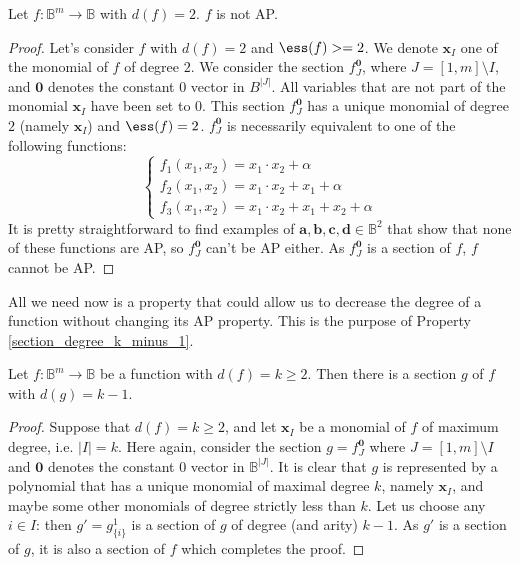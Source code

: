 \documentclass[article]{amsart}
\begin{document}
\begin{proper} \label{degree_2_not_AP}
 Let $f\colon \mathbb{B}^m\to \mathbb{B}$ with $d(f)=2$. $f$ is not AP.
\end{proper}
\begin{proof}
  Let's consider $f$ with $d(f) = 2$ and $\ess(f) >= 2$. We denote $\mathbf{x}_I$ one of the
  monomial of $f$ of degree $2$. We consider the section $f^{\mathbf{0}}_J$,
  where $J = [1, m] \setminus I$,  and $\mathbf{0}$ denotes the constant 0
  vector in $B^{|J|}$. All variables that are not part of the monomial
  $\mathbf{x}_I$ have been set to $0$. This section $f^{\mathbf{0}}_J$ has a
  unique monomial of degree $2$ (namely $\mathbf{x}_I$) and $\ess(f) = 2$.
  $f^{\mathbf{0}}_J$ is necessarily equivalent to one of the following
  functions:
  $$
  \begin{cases}
    f_1(x_1, x_2) = x_1 \cdot x_2 + \alpha \\
    f_2(x_1, x_2) = x_1 \cdot x_2 + x_1 + \alpha\\
    f_3(x_1, x_2) = x_1 \cdot x_2 + x_1 + x_2 + \alpha
  \end{cases}$$
  It is pretty straightforward to find examples of $\mathbf{a}, \mathbf{b},
  \mathbf{c}, \mathbf{d} \in \mathbb{B}^2$
  that show that none of these functions are AP, so $f^{\mathbf{0}}_J$ can't
  be AP either. As $f^{\mathbf{0}}_J$ is a section of $f$, $f$ cannot be AP.
\end{proof}

All we need now is a property that could allow us to decrease the degree of a
function without changing its AP property. This is the purpose of
Property \ref{section_degree_k_minus_1}.

\begin{proper}\label{section_degree_k_minus_1}
Let $f:\mathbb{B}^m\rightarrow \mathbb{B}$ be a function with
  $d(f)=k\geq 2$. Then there is a section $g$ of $f$ with $d(g)=k-1$.
\end{proper}
\begin{proof}
Suppose that  $d(f)=k\geq 2$, and let $\mathbf{x}_I$ be a monomial of $f$ of
  maximum degree, i.e. $|I|=k$.  Here again, consider the section $g =
  f^{\mathbf{0}}_J$ where $J = [1, m] \setminus I$ and $\mathbf{0}$ denotes the
  constant $0$ vector in $\mathbb{B}^{|J|}$. It is clear that $g$ is
  represented by a  polynomial that has a unique monomial of maximal degree
  $k$, namely $\mathbf{x}_I$, and maybe some other monomials of degree strictly
  less than $k$.  Let us choose any $i \in I$: then $g' = g^1_{\{i\}}$ is a
  section of $g$ of degree (and arity) $k-1$. As $g'$ is a section of $g$, it
  is also a section of $f$ which completes the proof.
\end{proof}
\end{document}
